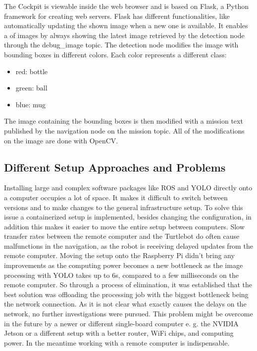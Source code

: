 The Cockpit is viewable inside the web browser and is based on Flask, a Python framework for creating web servers. Flask has different functionalities, like automatically updating the shown image when a new one is available. It enables a  of images by always showing the latest image retrieved by the detection node through the debug\_image topic. The detection node modifies the image with bounding boxes in different colors. Each color represents a different class:

\begin{itemize}
    \item red: bottle
    \item green: ball
    \item blue: mug
\end{itemize}

The image containing the bounding boxes is then modified with a mission text published by the navigation node on the mission topic. All of the modifications on the image are done with OpenCV.

\subsection{Different Setup Approaches and Problems}

Installing large and complex software packages like \ac{ROS} and \ac{YOLO} directly onto a computer occupies a lot of space. It makes it difficult to switch between versions and to make changes to the general infrastructure setup. To solve this issue a containerized setup is implemented, besides changing the configuration, in addition this makes it easier to move the entire setup between computers.
Slow transfer rates between the remote computer and the Turtlebot do often cause malfunctions in the navigation, as the robot is receiving delayed updates from the remote computer. Moving the setup onto the Raspberry Pi didn’t bring any improvements as the computing power becomes a new bottleneck as the image processing with YOLO takes up to 6s, compared to a few milliseconds on the remote computer. So through a process of elimination, it was established that the best solution was offloading the processing job with the biggest bottleneck being the network connection. As it is not clear what exactly causes the delays on the network, no further investigations were pursued. This problem might be overcome in the future by a newer or different single-board computer e. g. the NVIDIA Jetson or a different setup with a better router, WiFi chips, and computing power. In the meantime working with a remote computer is indispensable.